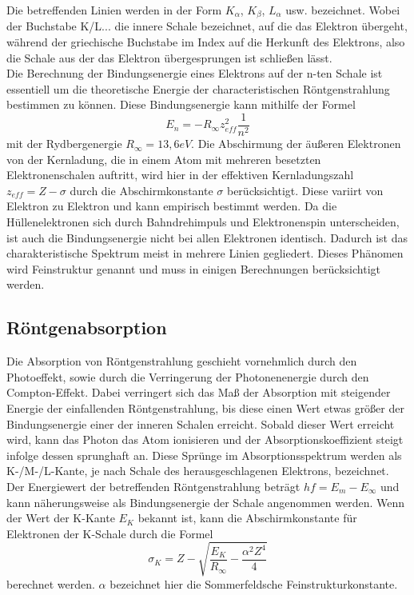 Die betreffenden Linien werden in der Form $K_\alpha$, $K_\beta$, $L_\alpha$ usw. bezeichnet. Wobei der Buchstabe K/L... die innere Schale bezeichnet, auf die das Elektron übergeht, während der griechische Buchstabe im Index auf die Herkunft des Elektrons, also die Schale aus der das Elektron übergesprungen ist schließen lässt. \\
Die Berechnung der Bindungsenergie eines Elektrons auf der n-ten Schale ist essentiell um die theoretische Energie der characteristischen Röntgenstrahlung bestimmen zu können. Diese Bindungsenergie kann mithilfe der Formel
\begin{equation}
E_n=-R_{\infty}z_{eff}^2\frac{1}{n^2}
\end{equation}
mit der Rydbergenergie $R_{\infty}=13,6 eV$. Die Abschirmung der äußeren Elektronen von der Kernladung, die in einem Atom mit mehreren besetzten Elektronenschalen auftritt, wird hier in der effektiven Kernladungszahl $z_{eff}=Z-\sigma$ durch die Abschirmkonstante $\sigma$ berücksichtigt. Diese variirt von Elektron zu Elektron und kann empirisch bestimmt werden.
Da die Hüllenelektronen sich durch Bahndrehimpuls und Elektronenspin unterscheiden, ist auch die Bindungsenergie nicht bei allen Elektronen identisch. Dadurch ist das charakteristische Spektrum meist in mehrere Linien gegliedert. Dieses Phänomen wird Feinstruktur genannt und muss in einigen Berechnungen berücksichtigt werden.
\subsection{Röntgenabsorption}
Die Absorption von Röntgenstrahlung geschieht vornehmlich durch den Photoeffekt, sowie durch die Verringerung der Photonenenergie durch den Compton-Effekt. Dabei verringert sich das Maß der Absorption mit steigender Energie der einfallenden Röntgenstrahlung, bis diese einen Wert etwas größer der Bindungsenergie einer der inneren Schalen erreicht. Sobald dieser Wert erreicht wird, kann das Photon das Atom ionisieren und der Absorptionskoeffizient steigt infolge dessen sprunghaft an.
Diese Sprünge im Absorptionsspektrum werden als K-/M-/L-Kante, je nach Schale des herausgeschlagenen Elektrons, bezeichnet. Der Energiewert der betreffenden Röntgenstrahlung beträgt $hf=E_m-E_{\infty}$ und kann näherungsweise als Bindungsenergie der Schale angenommen werden. 
Wenn der Wert der K-Kante $E_K$ bekannt ist, kann die Abschirmkonstante für Elektronen der K-Schale durch die Formel
\begin{equation}
\sigma_K=Z-\sqrt{\frac{E_K}{R_{\infty}}-\frac{\alpha^2Z^4}{4}}
\end{equation}
berechnet werden. $\alpha$ bezeichnet hier die Sommerfeldsche Feinstrukturkonstante. 
